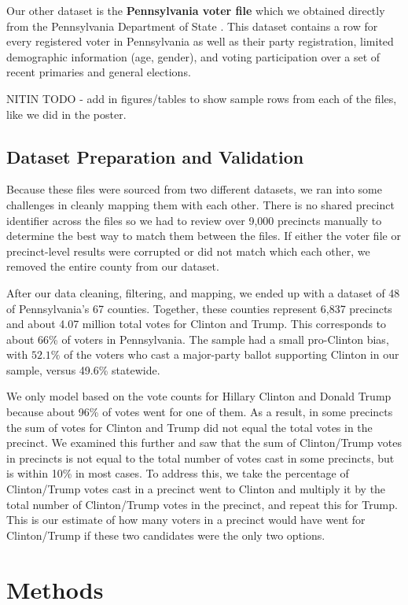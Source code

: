 \documentclass[10pt, letterpaper]{article}
\begin{document}
Our other dataset is the \textbf{Pennsylvania voter file} which we obtained directly from the Pennsylvania Department of State \cite{PAVoterFile}. This dataset contains a row for every registered voter in Pennsylvania as well as their party registration, limited demographic information (age, gender), and voting participation over a set of recent primaries and general elections.

NITIN TODO - add in figures/tables to show sample rows from each of the files, like we did in the poster.

\subsection{Dataset Preparation and Validation}

Because these files were sourced from two different datasets, we ran into some challenges in cleanly mapping them with each other. There is no shared precinct identifier across the files so we had to review over 9,000 precincts manually to determine the best way to match them between the files. If either the voter file or precinct-level results were corrupted or did not match which each other, we removed the entire county from our dataset.

After our data cleaning, filtering, and mapping, we ended up with a dataset of 48 of Pennsylvania's 67 counties. Together, these counties represent 6,837 precincts and about 4.07 million total votes for Clinton and Trump. This corresponds to about 66\% of voters in Pennsylvania. The sample had a small pro-Clinton bias, with $52.1\%$ of the voters who cast a major-party ballot supporting Clinton in our sample, versus 49.6\% statewide. 

We only model based on the vote counts for Hillary Clinton and Donald Trump because about 96\% of votes went for one of them. As a result, in some precincts the sum of votes for Clinton and Trump did not equal the total votes in the precinct. We examined this further and saw that the sum of Clinton/Trump votes in precincts is not equal to the total number of votes cast in some precincts, but is within 10\% in most cases. To address this, we take the percentage of Clinton/Trump votes cast in a precinct went to Clinton and multiply it by the total number of Clinton/Trump votes in the precinct, and repeat this for Trump. This is our estimate of how many voters in a precinct would have went for Clinton/Trump if these two candidates were the only two options.

\section{Methods}
\end{document}
